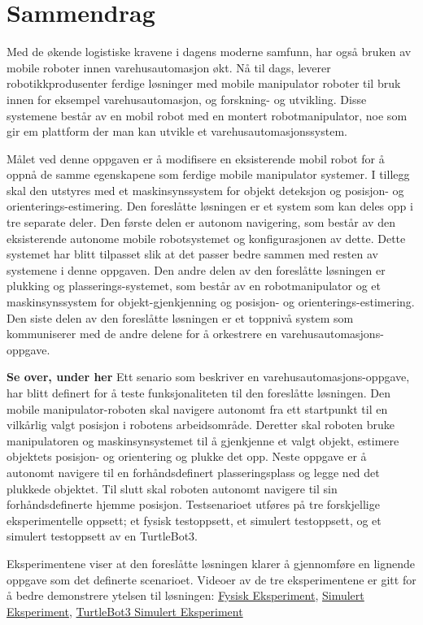 \chapter*{Sammendrag}
Med de økende logistiske kravene i dagens moderne samfunn, har også bruken av mobile roboter innen varehusautomasjon økt. Nå til dags, leverer robotikkprodusenter ferdige løsninger med mobile manipulator roboter til bruk innen for eksempel varehusautomasjon, og forskning- og utvikling. Disse systemene består av en mobil robot med en montert robotmanipulator, noe som gir em plattform der man kan utvikle et varehusautomasjonssystem. 

Målet ved denne oppgaven er å modifisere en eksisterende mobil robot for å oppnå de samme egenskapene som ferdige mobile manipulator systemer. I tillegg skal den utstyres med et maskinsynssystem for objekt deteksjon og posisjon- og orienterings-estimering. Den foreslåtte løsningen er et system som kan deles opp i tre separate deler. Den første delen er autonom navigering, som består av den eksisterende autonome mobile robotsystemet og konfigurasjonen av dette. Dette systemet har blitt tilpasset slik at det passer bedre sammen med resten av systemene i denne oppgaven. Den andre delen av den foreslåtte løsningen er plukking og plasserings-systemet, som består av en robotmanipulator og et maskinsynssystem for objekt-gjenkjenning og posisjon- og orienterings-estimering. Den siste delen av den foreslåtte løsningen er et toppnivå system som kommuniserer med de andre delene for å orkestrere en varehusautomasjons-oppgave.


\textbf{Se over, under her}
Ett senario som beskriver en varehusautomasjons-oppgave, har blitt definert for å teste funksjonaliteten til den foreslåtte løsningen. Den mobile manipulator-roboten skal navigere autonomt fra ett startpunkt til en vilkårlig valgt posisjon i robotens arbeidsområde. Deretter skal roboten bruke manipulatoren og maskinsynsystemet til å gjenkjenne et valgt objekt, estimere objektets posisjon- og orientering og plukke det opp. Neste oppgave er å autonomt navigere til en forhåndsdefinert plasseringsplass og legge ned det plukkede objektet. Til slutt skal roboten autonomt navigere til sin forhåndsdefinerte hjemme posisjon. Testsenarioet utføres på tre forskjellige eksperimentelle oppsett; et fysisk testoppsett, et simulert testoppsett, og et simulert testoppsett av en TurtleBot3.

Eksperimentene viser at den foreslåtte løsningen klarer å gjennomføre en lignende oppgave som det definerte scenarioet. 
Videoer av de tre eksperimentene er gitt for å bedre demonstrere ytelsen til løsningen: \href{https://youtu.be/hxrZh7bj16A}{Fysisk Eksperiment}, \href{https://youtu.be/po9pRVNtn78}{Simulert Eksperiment}, \href{https://youtu.be/_Dy3rSTHWYo}{TurtleBot3 Simulert Eksperiment}
